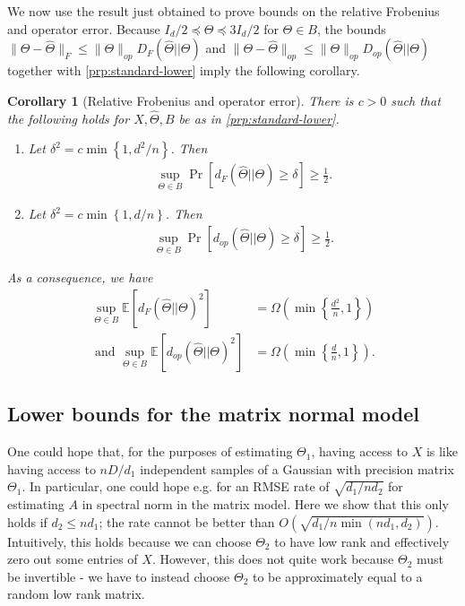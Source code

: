 \documentclass[aos]{imsart}
\newtheorem{corollary}[theorem]{Corollary}
\theoremstyle{definition}
\numberwithin{equation}{section}
\newcommand{\htheta}{\widehat{\Theta}}
\newcommand{\E}{\mathbb{E}}
\begin{document}
We now use the result just obtained to prove bounds on the relative Frobenius and operator error. Because $I_d/2 \preceq \Theta \preceq 3I_d/2$ for $\Theta \in B$, the bounds $\|\Theta - \htheta\|_F \leq \|\Theta\|_{op} D_F(\htheta|| \Theta)$ and $\|\Theta - \htheta\|_{op} \leq \|\Theta\|_{op} D_{op}(\htheta|| \Theta)$ together with \cref{prp:standard-lower} imply the following corollary.
\begin{corollary}[Relative Frobenius and operator error]\label{prp:relative-lower}
There is $c > 0$ such that the following holds for $X, \htheta, B$ be as in \cref{prp:standard-lower}.
\begin{enumerate}
\item Let $\delta^2 = c\min \left\{1,d^2/n\right\}$. Then
\begin{align}
\sup_{\Theta \in B} \Pr\left[ d_F(\htheta|| \Theta)  \geq \delta\right] \geq \frac{1}{2}.\label{eq:frob-lower}
\end{align}
\item Let $\delta^2 = c\min \left\{1,d/n\right\}$. Then
 \begin{align}
\sup_{\Theta \in B} \Pr\left[ d_{op}(\htheta|| \Theta) \geq \delta\right] \geq \frac{1}{2}. \label{eq:op-lower}
\end{align}
\end{enumerate}
As a consequence, we have 
\begin{align*}\sup_{\Theta \in B}\E[d_F(\htheta|| \Theta)^2] &=\Omega\left( \min \left\{\frac{d^2}{n},1\right\}\right)\\
\text{ and } \sup_{\Theta \in B}\E[d_{op}(\htheta|| \Theta)^2] &= \Omega\left( \min \left\{\frac{d}{n},1\right\}\right).\end{align*}

\end{corollary}





\subsection{Lower bounds for the matrix normal model}
One could hope that, for the purposes of estimating $\Theta_1$, having access to $X$ is like having access to $n D/d_1$ independent samples of a Gaussian with precision matrix $\Theta_1$. In particular, one could hope e.g. for an RMSE rate of $\sqrt{ d_1/ n d_2}$ for estimating $A$ in spectral norm in the matrix model. Here we show that this only holds if $d_2 \leq n d_1$; the rate cannot be better than $O(\sqrt{d_1/ n \min(n d_1, d_2)})$. Intuitively, this holds because we can choose $\Theta_2$ to have low rank and effectively zero out some entries of $X$. However, this does not quite work because $\Theta_2$ must be invertible - we have to instead choose $\Theta_2$ to be approximately equal to a random low rank matrix.
\end{document}
